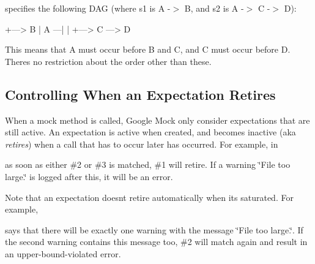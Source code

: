 specifies the following D\+AG (where {\ttfamily s1} is {\ttfamily A -\/$>$ B}, and {\ttfamily s2} is {\ttfamily A -\/$>$ C -\/$>$ D})\+:


\begin{DoxyCode}
     +---> B
     |
A ---|
     |
     +---> C ---> D
\end{DoxyCode}


This means that A must occur before B and C, and C must occur before D. There\textquotesingle{}s no restriction about the order other than these.

\subsection*{Controlling When an Expectation Retires}

When a mock method is called, Google Mock only consider expectations that are still active. An expectation is active when created, and becomes inactive (aka {\itshape retires}) when a call that has to occur later has occurred. For example, in




as soon as either \#2 or \#3 is matched, \#1 will retire. If a warning {\ttfamily \char`\"{}\+File too large.\char`\"{}} is logged after this, it will be an error.

Note that an expectation doesn\textquotesingle{}t retire automatically when it\textquotesingle{}s saturated. For example,




says that there will be exactly one warning with the message {\ttfamily \char`\"{}\+File
too large.\char`\"{}}. If the second warning contains this message too, \#2 will match again and result in an upper-\/bound-\/violated error.

